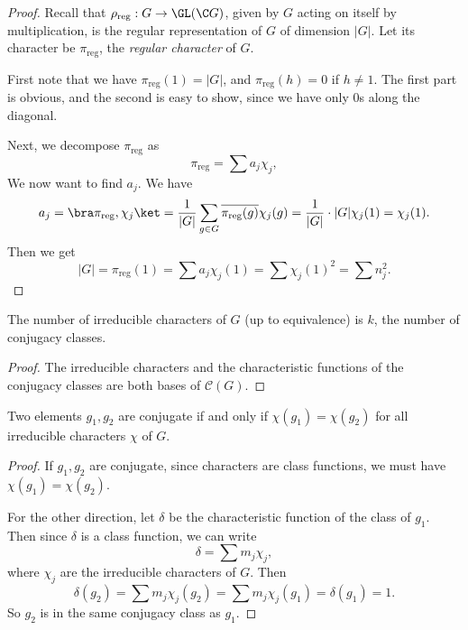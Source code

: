 \documentclass[a4paper]{article}
\begin{document}
\begin{proof}
  Recall that $\rho_{\mathrm{reg}}: G \to \GL(\C G)$, given by $G$ acting on itself by multiplication, is the regular representation of $G$ of dimension $|G|$. Let its character be $\pi_{\mathrm{reg}}$, the \emph{regular character} of $G$.

  First note that we have $\pi_{\mathrm{reg}}(1) = |G|$, and $\pi_{\mathrm{reg}}(h) = 0$ if $h\not= 1$. The first part is obvious, and the second is easy to show, since we have only $0$s along the diagonal.

  Next, we decompose $\pi_{\mathrm{reg}}$ as
  \[
    \pi_{\mathrm{reg}} = \sum a_j \chi_j,
  \]
  We now want to find $a_j$. We have
  \[
    a_j = \bra \pi_{\mathrm{reg}}, \chi_j\ket = \frac{1}{|G|} \sum_{g \in G} \overline{\pi_{\mathrm{reg}}(g)} \chi_j(g) = \frac{1}{|G|} \cdot |G| \chi_j(1) = \chi_j(1).
  \]
  Then we get
  \[
    |G| = \pi_{\mathrm{reg}}(1) = \sum a_j \chi_j(1) = \sum \chi_j(1)^2 = \sum n_j^2.
  \]
\end{proof}

\begin{cor}
  The number of irreducible characters of $G$ (up to equivalence) is $k$, the number of conjugacy classes.
\end{cor}

\begin{proof}
  The irreducible characters and the characteristic functions of the conjugacy classes are both bases of $\mathcal{C}(G)$.
\end{proof}

\begin{cor}
  Two elements $g_1, g_2$ are conjugate if and only if $\chi(g_1) = \chi(g_2)$ for all irreducible characters $\chi$ of $G$.
\end{cor}

\begin{proof}
  If $g_1, g_2$ are conjugate, since characters are class functions, we must have $\chi(g_1) = \chi(g_2)$.

  For the other direction, let $\delta$ be the characteristic function of the class of $g_1$. Then since $\delta$ is a class function, we can write
  \[
    \delta = \sum m_j \chi_j,
  \]
  where $\chi_j$ are the irreducible characters of $G$. Then
  \[
    \delta(g_2) = \sum m_j \chi_j(g_2) = \sum m_j \chi_j(g_1) = \delta(g_1) = 1.
  \]
  So $g_2$ is in the same conjugacy class as $g_1$.
\end{proof}
\end{document}
